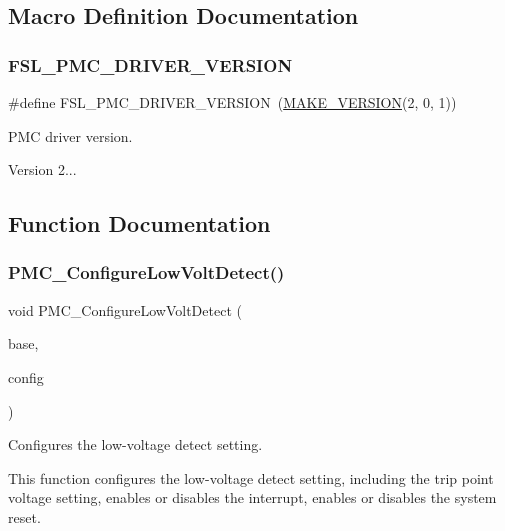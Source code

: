 \subsection{Macro Definition Documentation}
\mbox{\label{group__pmc_ga73519be5675b92701f27a75deec47471}} 
\subsubsection{\texorpdfstring{FSL\_PMC\_DRIVER\_VERSION}{FSL\_PMC\_DRIVER\_VERSION}}
{\footnotesize\ttfamily \#define F\+S\+L\+\_\+\+P\+M\+C\+\_\+\+D\+R\+I\+V\+E\+R\+\_\+\+V\+E\+R\+S\+I\+ON~(\mbox{\hyperlink{group__ftfx__utilities_ga812138aa3315b0c6953c1a26130bcc37}{M\+A\+K\+E\+\_\+\+V\+E\+R\+S\+I\+ON}}(2, 0, 1))}



P\+MC driver version. 

Version 2... 

\subsection{Function Documentation}
\mbox{\label{group__pmc_ga511f9618f4a4a78c0d18fb1f53ab5256}} 
\subsubsection{\texorpdfstring{PMC\_ConfigureLowVoltDetect()}{PMC\_ConfigureLowVoltDetect()}}
{\footnotesize\ttfamily void P\+M\+C\+\_\+\+Configure\+Low\+Volt\+Detect (\begin{DoxyParamCaption}\item[{\mbox{\hyperlink{struct_p_m_c___type}{P\+M\+C\+\_\+\+Type}} $\ast$}]{base,  }\item[{const \mbox{\hyperlink{group__pmc_ga6614b7fa35b6399db446c0d0e7304406}{pmc\+\_\+low\+\_\+volt\+\_\+detect\+\_\+config\+\_\+t}} $\ast$}]{config }\end{DoxyParamCaption})}



Configures the low-\/voltage detect setting. 

This function configures the low-\/voltage detect setting, including the trip point voltage setting, enables or disables the interrupt, enables or disables the system reset.


